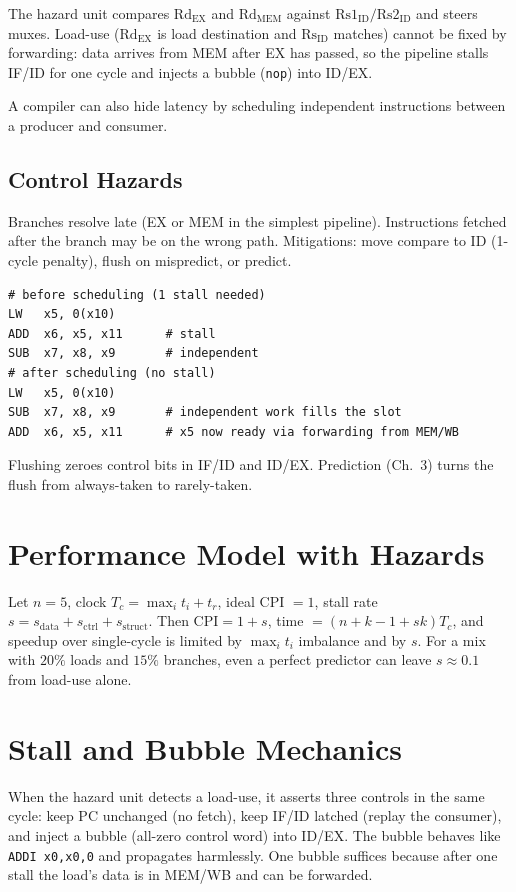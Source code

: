 The hazard unit compares $\text{Rd}_{\text{EX}}$ and $\text{Rd}_{\text{MEM}}$ against $\text{Rs1}_{\text{ID}}/\text{Rs2}_{\text{ID}}$ and steers muxes. Load-use ($\text{Rd}_{\text{EX}}$ is load destination and $\text{Rs}_{\text{ID}}$ matches) cannot be fixed by forwarding: data arrives from MEM after EX has passed, so the pipeline stalls IF/ID for one cycle and injects a bubble (\texttt{nop}) into ID/EX.

A compiler can also hide latency by scheduling independent instructions between a producer and consumer.

\subsection{Control Hazards}
Branches resolve late (EX or MEM in the simplest pipeline). Instructions fetched after the branch may be on the wrong path. Mitigations: move compare to ID (1-cycle penalty), flush on mispredict, or predict.

\begin{lstlisting}[language={[x86masm]Assembler}, caption={Compiler scheduling hides a load-use hazard}, label={lst:schedule}]
# before scheduling (1 stall needed)
LW   x5, 0(x10)
ADD  x6, x5, x11      # stall
SUB  x7, x8, x9       # independent
# after scheduling (no stall)
LW   x5, 0(x10)
SUB  x7, x8, x9       # independent work fills the slot
ADD  x6, x5, x11      # x5 now ready via forwarding from MEM/WB
\end{lstlisting}

Flushing zeroes control bits in IF/ID and ID/EX. Prediction (Ch.~3) turns the flush from always-taken to rarely-taken.

\section{Performance Model with Hazards}
Let $n=5$, clock $T_c = \max_i t_i + t_r$, ideal CPI $=1$, stall rate $s = s_{\text{data}}+s_{\text{ctrl}}+s_{\text{struct}}$. Then $\text{CPI}=1+s$, time $=(n+k-1+s k)T_c$, and speedup over single-cycle is limited by $\max_i t_i$ imbalance and by $s$. For a mix with $20\%$ loads and $15\%$ branches, even a perfect predictor can leave $s\approx0.1$ from load-use alone.

\section{Stall and Bubble Mechanics}
When the hazard unit detects a load-use, it asserts three controls in the same cycle: keep PC unchanged (no fetch), keep IF/ID latched (replay the consumer), and inject a bubble (all-zero control word) into ID/EX. The bubble behaves like \texttt{ADDI x0,x0,0} and propagates harmlessly. One bubble suffices because after one stall the load's data is in MEM/WB and can be forwarded.

